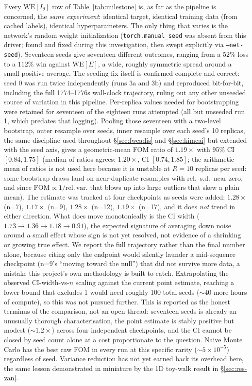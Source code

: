 \documentclass[a4paper,fleqn]{cas-sc}
\begin{document}
Every $\mathrm{WE}[I_\theta]$ row of Table~\ref{tab:milestone} is, as far as the pipeline
is concerned, the
\emph{same experiment}: identical target, identical training data (from cached labels),
identical hyperparameters. The only thing that varies is the network's random weight
initialization (\texttt{torch.manual\_seed} was absent from this driver; found and
fixed during this investigation, then swept explicitly via \texttt{--net-seed}).
Seventeen seeds give seventeen different outcomes, ranging from a $52\%$ loss to
	a $112\%$ win against $\mathrm{WE}[E]$, a wide, roughly symmetric spread around a
small positive average. The seeding fix itself is confirmed complete and correct: seed
0 was run twice independently (runs 3a and 3b) and reproduced bit-for-bit, including the
full 1774--1776s wall-clock trajectory, ruling out any other unseeded source of
variation in this pipeline. Per-replica values needed for bootstrapping were retained
for seventeen of the eighteen runs attempted (all but unseeded run 1, which predates that
logging).
Pooling those seventeen with a two-level bootstrap, outer resample over seeds,
inner resample over each seed's 10 replicas, the same discipline used throughout
\S\ref{sec:fwcadis} and \S\ref{sec:kimcai} but extended with the seed axis, gives a
geometric-mean FOM ratio of $1.19\times$ with 95\% CI $[0.84, 1.75]$ (median-of-ratios
agrees: $1.20\times$, CI $[0.74, 1.85]$; the arithmetic mean of ratios is not used here
because it is unstable at $R=10$ replicas per seed: some bootstrap draws land on
near-duplicate resamples with rel.\ s.d.\ near zero, and since $\mathrm{FOM}\propto
1/\mathrm{rel.\,var.}$ that blows up into large outliers that skew a plain mean).
The estimate was tracked at four checkpoints as seeds were added: $1.28\times$
(n=7), $1.17\times$ (n=9), $1.28\times$ (n=12), $1.19\times$ (n=17), and it does
\emph{not} trend in either direction. What does move monotonically is the CI width
($1.73\to1.36\to1.18\to0.91$), the expected signature of averaging down noise around a
small effect whose sign is not yet resolved, not evidence of a shrinking or growing true
effect. We report the full trajectory rather than the final number alone, because citing
only the endpoint would silently launder a mid-sequence checkpoint (n=9's ``moving
toward the null'') that did not survive more data, a mistake this project's own
methodology is built to catch.
Extrapolating the observed CI-width-vs-$n$ scaling against the current point
	estimate, reaching a lower bound that excludes 1 would need roughly 100 total seeds
	($\sim\!40$ more hours of compute), so this was not pursued further. This is reported as
the honest terminus of the comparison, not an open
thread: seventeen seeds is already an unusually thorough characterisation, the point
estimate is stably positive but modest ($\sim\!1.2\times$) across four independent
checkpoints, and the CI cannot be closed by seed count alone
at a cost proportionate to
the question. Naive Monte Carlo has the best raw FOM in every run
at this specific rarity ($\sim\!5\times10^{-5}$) regardless of seed. Variance
reduction has not yet earned back its overhead here, the same lesson demonstrated in
miniature by the 1D toy-walk result in \S\ref{sec:res-van}.
\end{document}
